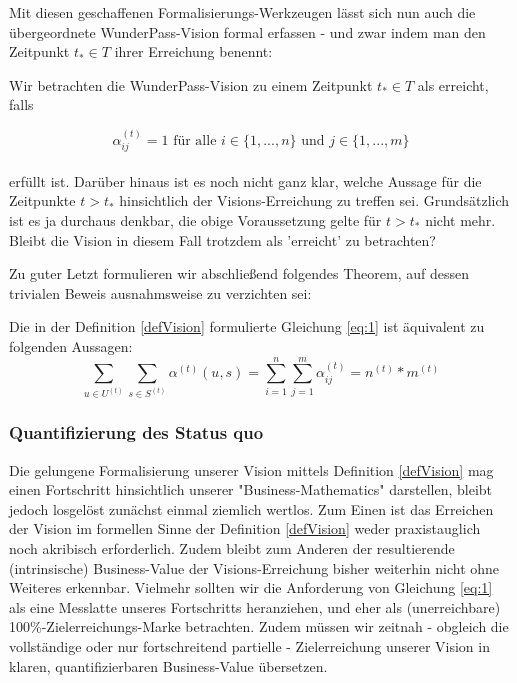 \documentclass[11pt]{scrartcl}
\newcounter{mycount}
\begin{document}
Mit diesen geschaffenen Formalisierungs-Werkzeugen lässt sich nun auch die übergeordnete WunderPass-Vision formal erfassen - und zwar indem man den Zeitpunkt $t_{*} \in T$ ihrer Erreichung benennt:

\begin{Def}\label{defVision}

Wir betrachten die WunderPass-Vision zu einem Zeitpunkt $t_{*} \in T$ als erreicht, falls

\vspace{0.3cm}

\begin{equation}
\label{eq:1}
  \alpha^{(t)}_{ij} = 1 \textrm{ für alle } i \in \{1,...,n\} \textrm{ und } j \in \{1,...,m\}
\end{equation}\\
erfüllt ist. Darüber hinaus ist es noch nicht ganz klar, welche Aussage für die Zeitpunkte $t > t_{*}$ hinsichtlich der Visions-Erreichung zu treffen sei. Grundsätzlich ist es ja durchaus denkbar, die obige Voraussetzung gelte für $t > t_{*}$ nicht mehr. Bleibt die Vision in diesem Fall trotzdem als 'erreicht' zu betrachten?


\end{Def}

\vspace{1cm}

Zu guter Letzt formulieren wir abschließend folgendes Theorem, auf dessen trivialen Beweis ausnahmsweise zu verzichten sei:

\vspace{0.3cm}

\begin{Theorem}
Die in der Definition \ref{defVision} formulierte Gleichung \eqref{eq:1} ist äquivalent zu folgenden Aussagen: 
\begin{equation*}
  \sum_{u \in U^{(t)}} \sum_{s \in S^{(t)}} \alpha^{(t)}(u, s) = \sum_{i=1}^n \sum_{j=1}^m \alpha^{(t)}_{ij} = n^{(t)} * m^{(t)}
\end{equation*}
\end{Theorem}

\subsubsection{Quantifizierung des Status quo}
\label{sec:eco_zahlen_status_quo}
Die gelungene Formalisierung unserer Vision mittels Definition \ref{defVision} mag einen Fortschritt hinsichtlich unserer "Business-Mathematics" darstellen, bleibt jedoch losgelöst zunächst einmal ziemlich wertlos. Zum Einen ist das Erreichen der Vision im formellen Sinne der Definition \ref{defVision} weder praxistauglich noch akribisch erforderlich. Zudem bleibt zum Anderen der resultierende (intrinsische) Business-Value der Visions-Erreichung bisher weiterhin nicht ohne Weiteres erkennbar.
Vielmehr sollten wir die Anforderung von Gleichung \eqref{eq:1} als eine Messlatte unseres Fortschritts heranziehen, und eher als (unerreichbare) 100\%-Zielerreichungs-Marke betrachten. Zudem müssen wir zeitnah - obgleich die vollständige oder nur fortschreitend partielle - Zielerreichung unserer Vision in klaren, quantifizierbaren Business-Value übersetzen.
\end{document}
